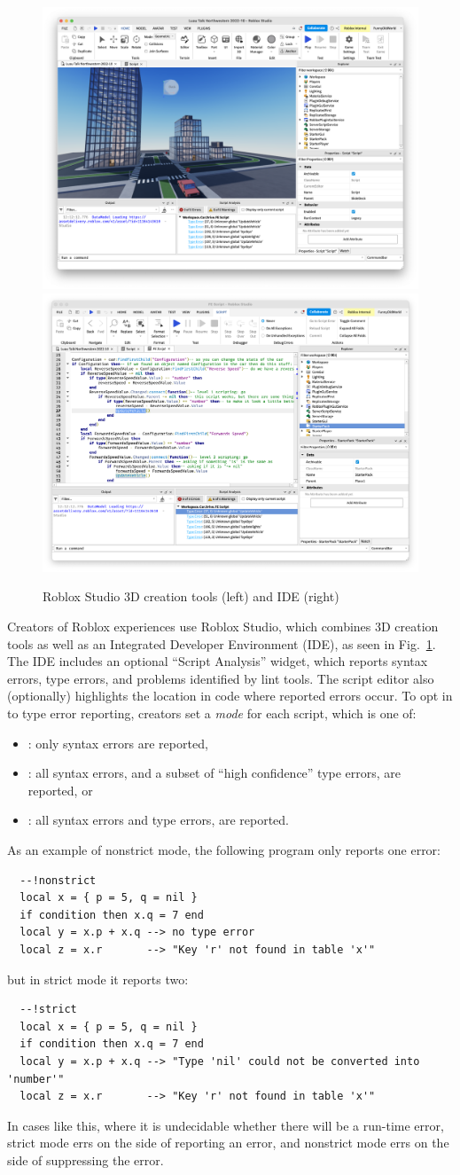 \documentclass[english,submission,cleveref]{programming}
\begin{document}
\begin{figure}

  \includegraphics[width=.45\textwidth]{img/roblox-studio.png}
  \includegraphics[width=.45\textwidth]{img/roblox-studio-ide.png}

  \caption{{Roblox Studio 3D creation} tools (left) and IDE (right)}
  \label{fig:roblox-studio}
\end{figure}

Creators of {Roblox experiences} use {Roblox Studio},
which combines {3D creation} tools as well as an Integrated
Developer Environment (IDE), as seen in Fig.~\ref{fig:roblox-studio}.
The IDE includes an optional ``Script Analysis'' widget, which
reports syntax errors, type errors, and problems identified by
lint tools. The script editor also (optionally) highlights
the location in code where reported errors occur.
To opt in to type error reporting, creators set a \emph{mode}
for each script, which is one of:
\begin{itemize}
  \item \mnocheck{}: only syntax errors are reported,
  \item \mnonstrict{}: all syntax errors, and a subset of ``high confidence'' type errors, are reported, or
  \item \mstrict{}: all syntax errors and type errors, are reported.
\end{itemize}
As an example of nonstrict mode, the following program only reports one error:
\begin{verbatim}
  --!nonstrict
  local x = { p = 5, q = nil }
  if condition then x.q = 7 end
  local y = x.p + x.q --> no type error
  local z = x.r       --> "Key 'r' not found in table 'x'"
\end{verbatim}
but in strict mode it reports two:
\begin{verbatim}
  --!strict
  local x = { p = 5, q = nil }
  if condition then x.q = 7 end
  local y = x.p + x.q --> "Type 'nil' could not be converted into 'number'"
  local z = x.r       --> "Key 'r' not found in table 'x'"
\end{verbatim}
In cases like this, where it is undecidable whether there will be a run-time error,
strict mode errs on the side of reporting an error, and nonstrict mode errs on
the side of suppressing the error.
\end{document}
